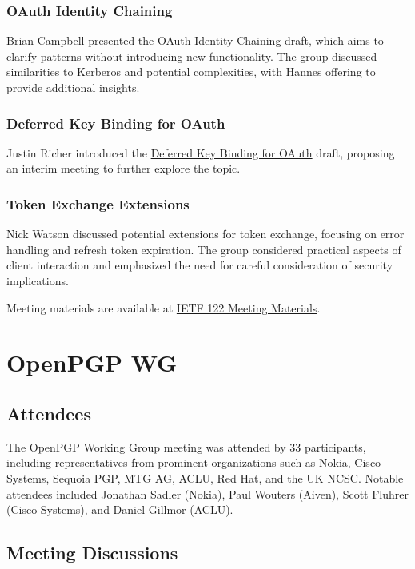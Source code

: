 \documentclass{article}
\begin{document}
\subsubsection{OAuth Identity Chaining}
Brian Campbell presented the \href{https://datatracker.ietf.org/doc/draft-ietf-oauth-identity-chaining/}{OAuth Identity Chaining} draft, which aims to clarify patterns without introducing new functionality. The group discussed similarities to Kerberos and potential complexities, with Hannes offering to provide additional insights.

\subsubsection{Deferred Key Binding for OAuth}
Justin Richer introduced the \href{https://datatracker.ietf.org/doc/html/draft-richer-oauth-tmb-claim}{Deferred Key Binding for OAuth} draft, proposing an interim meeting to further explore the topic.

\subsubsection{Token Exchange Extensions}
Nick Watson discussed potential extensions for token exchange, focusing on error handling and refresh token expiration. The group considered practical aspects of client interaction and emphasized the need for careful consideration of security implications.

Meeting materials are available at \href{https://datatracker.ietf.org/meeting/122/materials/}{IETF 122 Meeting Materials}.



\newpage

\section{OpenPGP WG}

\subsection{Attendees}
The OpenPGP Working Group meeting was attended by 33 participants, including representatives from prominent organizations such as Nokia, Cisco Systems, Sequoia PGP, MTG AG, ACLU, Red Hat, and the UK NCSC. Notable attendees included Jonathan Sadler (Nokia), Paul Wouters (Aiven), Scott Fluhrer (Cisco Systems), and Daniel Gillmor (ACLU).

\subsection{Meeting Discussions}
\end{document}
